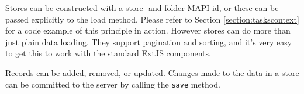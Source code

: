 Stores can be constructed with a store- and folder MAPI id, or these can be passed explicitly to the 
load method. Please refer to Section \ref{section:taskscontext} for a code example of this principle
in action. However stores can do more than just plain data loading. They support pagination and sorting,
and it's very easy to get this to work with the standard ExtJS components.

Records can be added, removed, or updated. Changes made to the data in a store can be committed to the 
server by calling the {\tt save} method. 


